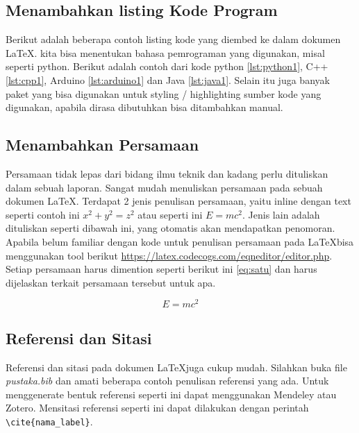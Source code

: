 \subsection{Menambahkan listing Kode Program}
Berikut adalah beberapa contoh listing kode yang diembed ke dalam dokumen \LaTeX. kita bisa menentukan bahasa pemrograman yang digunakan, misal seperti python. Berikut adalah contoh dari kode python \cref{lst:python1}, C++ \cref{lst:cpp1}, Arduino \cref{lst:arduino1} dan Java \cref{lst:java1}. Selain itu juga banyak paket yang bisa digunakan untuk styling / highlighting sumber kode yang digunakan, apabila dirasa dibutuhkan bisa ditambahkan manual.









\subsection{Menambahkan Persamaan}
Persamaan tidak lepas dari bidang ilmu teknik dan kadang perlu dituliskan dalam sebuah laporan. Sangat mudah menuliskan persamaan pada sebuah dokumen \LaTeX. Terdapat 2 jenis penulisan persamaan, yaitu inline dengan text seperti contoh ini \(x^2 + y^2 = z^2\) atau seperti ini $E=mc^2$. Jenis lain adalah dituliskan seperti dibawah ini, yang otomatis akan mendapatkan penomoran. Apabila belum familiar dengan kode untuk penulisan persamaan pada \LaTeX bisa menggunakan tool berikut \url{https://latex.codecogs.com/eqneditor/editor.php}. Setiap persamaan harus dimention seperti berikut ini \cref{eq:satu} dan harus dijelaskan terkait persamaan tersebut untuk apa.

\begin{equation}
    \label{eq:satu}
    E=mc^2
\end{equation}

\subsection{Referensi dan Sitasi}
Referensi dan sitasi pada dokumen \LaTeX juga cukup mudah. Silahkan buka file \textit{pustaka.bib} dan amati beberapa contoh penulisan referensi yang ada. Untuk menggenerate bentuk referensi seperti ini dapat menggunakan Mendeley atau Zotero. Mensitasi referensi seperti ini \cite{Kim2006} dapat dilakukan dengan perintah \verb|\cite{nama_label}|.

